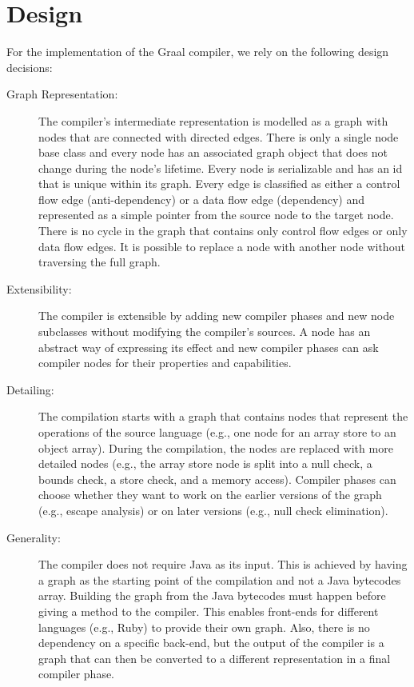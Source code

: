 \documentclass[twocolumn]{svjour3}
\begin{document}
\section{Design}
For the implementation of the Graal compiler, we rely on the following design decisions:
\begin{description}
\item[Graph Representation:]
The compiler's intermediate representation is modelled as a graph with nodes that are connected with directed edges.
There is only a single node base class and every node has an associated graph object that does not change during the node's lifetime.
Every node is serializable and has an id that is unique within its graph.
Every edge is classified as either a control flow edge (anti-dependency) or a data flow edge (dependency) and represented as a simple pointer from the source node to the target node.
There is no cycle in the graph that contains only control flow edges or only data flow edges.
It is possible to replace a node with another node without traversing the full graph.
\item[Extensibility:]
The compiler is extensible by adding new compiler phases and new node subclasses without modifying the compiler's sources.
A node has an abstract way of expressing its effect and new compiler phases can ask compiler nodes for their properties and capabilities.
\item[Detailing:]
The compilation starts with a graph that contains nodes that represent the operations of the source language (e.g., one node for an array store to an object array).
During the compilation, the nodes are replaced with more detailed nodes (e.g., the array store node is split into a null check, a bounds check, a store check, and a memory access).
Compiler phases can choose whether they want to work on the earlier versions of the graph (e.g., escape analysis) or on later versions (e.g., null check elimination).
\item[Generality:]
The compiler does not require Java as its input.
This is achieved by having a graph as the starting point of the compilation and not a Java bytecodes array.
Building the graph from the Java bytecodes must happen before giving a method to the compiler.
This enables front-ends for different languages (e.g., Ruby) to provide their own graph.
Also, there is no dependency on a specific back-end, but the output of the compiler is a graph that can then be converted to a different representation in a final compiler phase.
\end{description}
\end{document}
